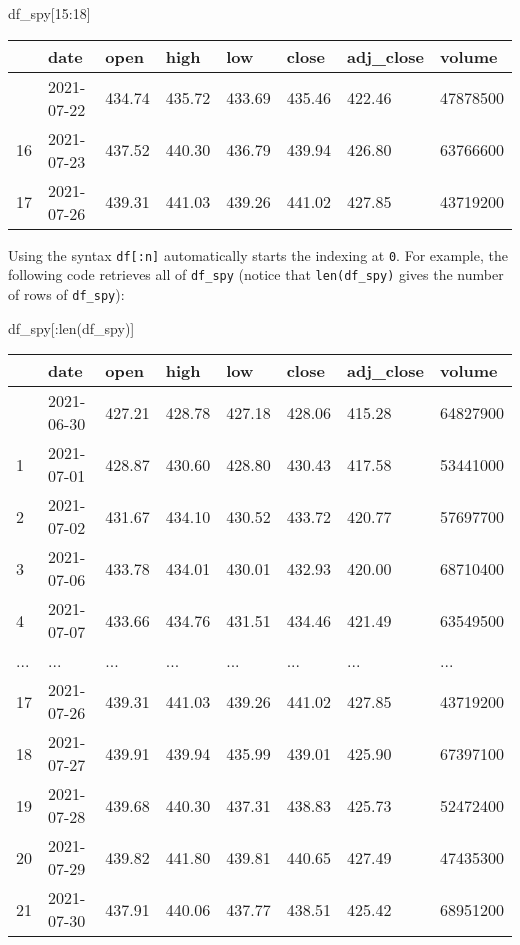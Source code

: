 \documentclass[
  letterpaper,
  DIV=11,
  numbers=noendperiod]{scrreprt}
\newenvironment{Shaded}{\begin{snugshade}}{\end{snugshade}}
\newcommand{\BuiltInTok}[1]{\textcolor[rgb]{0.00,0.23,0.31}{#1}}
\newcommand{\DecValTok}[1]{\textcolor[rgb]{0.68,0.00,0.00}{#1}}
\newcommand{\NormalTok}[1]{\textcolor[rgb]{0.00,0.23,0.31}{#1}}
\begin{document}
\begin{Shaded}
\begin{Highlighting}[]
\NormalTok{df\_spy[}\DecValTok{15}\NormalTok{:}\DecValTok{18}\NormalTok{]}
\end{Highlighting}
\end{Shaded}

\begin{longtable}[]{@{}llllllll@{}}
\toprule\noalign{}
& date & open & high & low & close & adj\_close & volume \\
\midrule\noalign{}
\endhead
\bottomrule\noalign{}
\endlastfoot
15 & 2021-07-22 & 434.74 & 435.72 & 433.69 & 435.46 & 422.46 &
47878500 \\
16 & 2021-07-23 & 437.52 & 440.30 & 436.79 & 439.94 & 426.80 &
63766600 \\
17 & 2021-07-26 & 439.31 & 441.03 & 439.26 & 441.02 & 427.85 &
43719200 \\
\end{longtable}

Using the syntax \texttt{df{[}:n{]}} automatically starts the indexing
at \texttt{0}. For example, the following code retrieves all of
\texttt{df\_spy} (notice that \texttt{len(df\_spy)} gives the number of
rows of \texttt{df\_spy}):

\begin{Shaded}
\begin{Highlighting}[]
\NormalTok{df\_spy[:}\BuiltInTok{len}\NormalTok{(df\_spy)]}
\end{Highlighting}
\end{Shaded}

\begin{longtable}[]{@{}llllllll@{}}
\toprule\noalign{}
& date & open & high & low & close & adj\_close & volume \\
\midrule\noalign{}
\endhead
\bottomrule\noalign{}
\endlastfoot
0 & 2021-06-30 & 427.21 & 428.78 & 427.18 & 428.06 & 415.28 &
64827900 \\
1 & 2021-07-01 & 428.87 & 430.60 & 428.80 & 430.43 & 417.58 &
53441000 \\
2 & 2021-07-02 & 431.67 & 434.10 & 430.52 & 433.72 & 420.77 &
57697700 \\
3 & 2021-07-06 & 433.78 & 434.01 & 430.01 & 432.93 & 420.00 &
68710400 \\
4 & 2021-07-07 & 433.66 & 434.76 & 431.51 & 434.46 & 421.49 &
63549500 \\
... & ... & ... & ... & ... & ... & ... & ... \\
17 & 2021-07-26 & 439.31 & 441.03 & 439.26 & 441.02 & 427.85 &
43719200 \\
18 & 2021-07-27 & 439.91 & 439.94 & 435.99 & 439.01 & 425.90 &
67397100 \\
19 & 2021-07-28 & 439.68 & 440.30 & 437.31 & 438.83 & 425.73 &
52472400 \\
20 & 2021-07-29 & 439.82 & 441.80 & 439.81 & 440.65 & 427.49 &
47435300 \\
21 & 2021-07-30 & 437.91 & 440.06 & 437.77 & 438.51 & 425.42 &
68951200 \\
\end{longtable}
\end{document}
